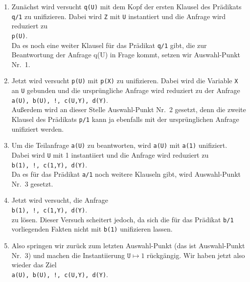 \begin{enumerate}
\item Zunächst wird versucht \texttt{q(U)} mit dem Kopf der ersten Klausel 
      des Prädikats \texttt{q/1}  zu unifizieren.  Dabei wird \texttt{Z} mit
      \texttt{U} instantiert und die Anfrage wird reduziert zu \\[0.1cm]
      \hspace*{1.3cm} \texttt{p(U)}. \\[0.1cm]
      Da es noch eine weiter Klausel für das Prädikat \texttt{q/1} gibt, die zur
      Beantwortung der Anfrage q(U) in Frage kommt, setzen wir Auswahl-Punkt Nr.~1.
\item Jetzt wird versucht \texttt{p(U)} mit \texttt{p(X)} zu unifizieren.  Dabei
      wird die Variable \texttt{X} an \texttt{U} gebunden und die ursprüngliche Anfrage
      wird reduziert zu der Anfrage \\[0.1cm]
      \hspace*{1.3cm}  
      \texttt{a(U), b(U), !, c(U,Y), d(Y)}. \\[0.1cm]
      Außerdem wird an dieser Stelle Auswahl-Punkt Nr.~2 gesetzt, denn die zweite Klausel
      des Prädikats \texttt{p/1} kann ja ebenfalls mit der ursprünglichen Anfrage unifiziert
      werden. 
\item Um die Teilanfrage \texttt{a(U)} zu beantworten, wird \texttt{a(U)} mit
      \texttt{a(1)} unifiziert.  Dabei wird \texttt{U} mit 1 instantiiert und die Anfrage wird reduziert zu \\[0.1cm]
      \hspace*{1.3cm} 
      \texttt{b(1), !, c(1,Y), d(Y)}. \\[0.1cm]
      Da es für das Prädikat \texttt{a/1} noch weitere Klauseln gibt, wird Auswahl-Punkt Nr.~3
      gesetzt.
\item Jetzt wird versucht, die Anfrage \\[0.1cm]
      \hspace*{1.3cm}    \texttt{b(1), !, c(1,Y), d(Y)}. \\[0.1cm]
      zu lösen.  Dieser Versuch scheitert jedoch, da sich die für das Prädikat \texttt{b/1}
      vorliegenden Fakten nicht mit \texttt{b(1)} unifizieren lassen.
\item Also springen wir zurück zum letzten Auswahl-Punkt (das ist Auswahl-Punkt Nr.~3)
      und machen die Instantiierung 
      $\texttt{U} \mapsto 1$ rückgängig.  Wir haben jetzt also wieder das Ziel \\[0.1cm]
      \hspace*{1.3cm} \texttt{a(U), b(U), !, c(U,Y), d(Y)}. 

\end{enumerate}
